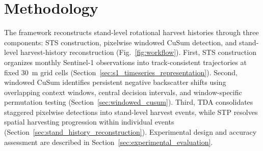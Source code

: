 \section{Methodology}
\label{sec:methods}

The framework reconstructs stand-level rotational harvest histories through three components: STS construction, pixelwise windowed CuSum detection, and stand-level harvest-history reconstruction (Fig.~\ref{fig:workflow}). First, STS construction organizes monthly Sentinel-1 observations into track-consistent trajectories at fixed 30~m grid cells (Section~\ref{sec:s1_timeseries_representation}). Second, windowed CuSum identifies persistent negative backscatter shifts using overlapping context windows, central decision intervals, and window-specific permutation testing (Section~\ref{sec:windowed_cusum}). Third, TDA consolidates staggered pixelwise detections into stand-level harvest events, while STP resolves spatial harvesting progression within individual events (Section~\ref{sec:stand_history_reconstruction}). Experimental design and accuracy assessment are described in Section~\ref{sec:experimental_evaluation}.



